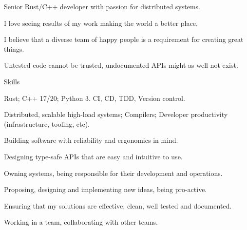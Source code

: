 \documentclass{resume}
\begin{document}
    Senior Rust/C++ developer with passion for distributed systems.
    
    I love seeing results of my work making the world a better place.
    
    I believe that a diverse team of happy people
    is a requirement for creating great things.
    
    Untested code cannot be trusted, undocumented APIs might
    as well not exist.

    \begin{rSection}{Skills}
        \begin{rSubsection}{}{}{}{}
            \item
                Rust;
                C++ 17/20;
                Python 3.
                CI, CD, TDD, Version control.
            \item
                Distributed, scalable high-load systems;
                Compilers;
                Developer productivity
                (infrastructure, tooling, etc).
        \end{rSubsection}
        \begin{rSubsection}{}{}{}{}
            \item
                Building software with reliability and ergonomics in mind.
            \item
                Designing type-safe APIs that are easy and intuitive to use.
        \end{rSubsection}
        \begin{rSubsection}{}{}{}{}
            \item
                Owning systems,
                being responsible for their development and operations.
            \item
                Proposing, designing and implementing new ideas,
                being pro-active.
            \item
                Ensuring that my solutions are
                effective, clean, well tested and documented.
            \item
                Working in a team,
                collaborating with other teams.
        \end{rSubsection}
    \end{rSection}
\end{document}
